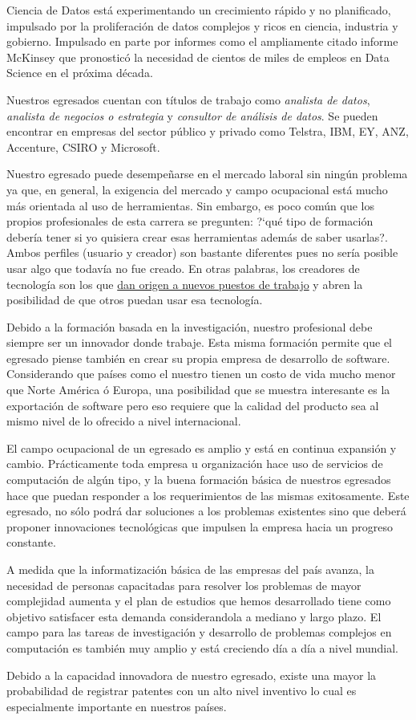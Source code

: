 Ciencia de Datos está experimentando un crecimiento rápido y no planificado, impulsado por la proliferación de datos complejos y ricos en ciencia, industria y gobierno. Impulsado en parte por informes como el ampliamente citado informe McKinsey que pronosticó la necesidad de cientos de miles de empleos en Data Science en el próxima década.

Nuestros egresados cuentan con títulos de trabajo como \emph{analista de datos}, \emph{analista de negocios o estrategia} y \emph{consultor de análisis de datos}. Se pueden encontrar en empresas del sector público y privado como Telstra, IBM, EY, ANZ, Accenture, CSIRO y Microsoft.

Nuestro egresado puede desempeñarse en el mercado laboral sin ningún problema ya que, en general, la exigencia del mercado y campo ocupacional está mucho más orientada al uso de herramientas. Sin embargo, 
es poco común que los propios profesionales de esta carrera se pregunten: ?`qué tipo de formación debería tener si yo quisiera crear esas herramientas además de saber usarlas?. Ambos perfiles (usuario y creador) 
son bastante diferentes pues no sería posible usar algo que todavía no fue creado. En otras palabras, 
los creadores de tecnología son los que \underline{dan origen a nuevos puestos de trabajo} y abren la 
posibilidad de que otros puedan usar esa tecnología.

Debido a la formación basada en la investigación, nuestro profesional debe siempre ser un innovador 
donde trabaje. Esta misma formación permite que el egresado piense también en crear su propia empresa 
de desarrollo de software. Considerando que países como el nuestro tienen un costo de vida mucho menor 
que Norte América ó Europa, una posibilidad que se muestra interesante es la exportación de software 
pero eso requiere que la calidad del producto sea al mismo nivel de lo ofrecido a nivel internacional.

El campo ocupacional de un egresado es amplio y está en continua expansión y cambio. Prácticamente 
toda empresa u organización hace uso de servicios de computación de algún tipo, y la buena formación 
básica de nuestros egresados hace que puedan responder a los requerimientos de las mismas exitosamente. 
Este egresado, no sólo podrá dar soluciones a los problemas existentes sino que deberá proponer innovaciones 
tecnológicas que impulsen la empresa hacia un progreso constante.

A medida que la informatización básica de las empresas del país avanza, la necesidad de personas 
capacitadas para resolver los problemas de mayor complejidad aumenta y el plan de estudios que hemos 
desarrollado tiene como objetivo satisfacer esta demanda considerandola a mediano y largo plazo. El campo 
para las tareas de investigación y desarrollo de problemas complejos en computación es también muy amplio 
y está creciendo día a día a nivel mundial.

Debido a la capacidad innovadora de nuestro egresado, existe una mayor la probabilidad de registrar 
patentes con un alto nivel inventivo lo cual es especialmente importante en nuestros países.

